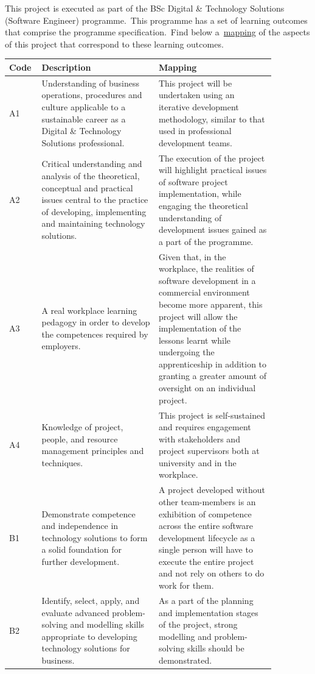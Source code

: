\documentclass[a4paper, 12pt, british]{article}
\begin{document}
This project is executed as part of the BSc Digital \& Technology Solutions (Software Engineer) programme.\ This programme has a set of learning outcomes that comprise the programme specification.\ Find below a~\hyperref[tab:lo_mapping]{mapping} of the aspects of this project that correspond to these learning outcomes.



\begin{longtable}{| p{0.07\linewidth} | p{0.4\linewidth} | p{0.4\linewidth} |}
    \hline
    Code & Description & Mapping \\
    \hline
    \hline
    A1 & Understanding of business operations, procedures and culture applicable to a sustainable career as a Digital \& Technology Solutions professional.\ & This project will be undertaken using an iterative development methodology, similar to that used in professional development teams. \\
    \hline
    A2 & Critical understanding and analysis of the theoretical, conceptual and practical issues central to the practice of developing, implementing and maintaining technology solutions.\ & The execution of the project will highlight practical issues of software project implementation, while engaging the theoretical understanding of development issues gained as a part of the programme. \\
    \hline
    A3 & A real workplace learning pedagogy in order to develop the competences required by employers.\ & Given that, in the workplace, the realities of software development in a commercial environment become more apparent, this project will allow the implementation of the lessons learnt while undergoing the apprenticeship in addition to granting a greater amount of oversight on an individual project. \\
    \hline
    A4 & Knowledge of project, people, and resource management principles and techniques.\ & This project is self-sustained and requires engagement with stakeholders and project supervisors both at university and in the workplace. \\
    \hline
    \hline
    B1 & Demonstrate competence and independence in technology solutions to form a solid foundation for further
    development.\ & A project developed without other team-members is an exhibition of competence across the entire software development lifecycle as a single person will have to execute the entire project and not rely on others to do work for them. \\
    \hline
    B2 & Identify, select, apply, and evaluate advanced problem-solving and modelling skills appropriate to developing technology solutions for business.\ & As a part of the planning and implementation stages of the project, strong modelling and problem-solving skills should be demonstrated. \\

\end{longtable}
\end{document}
